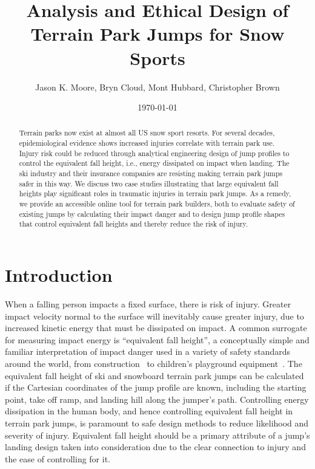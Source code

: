 \documentclass{article}
\title{Analysis and Ethical Design of Terrain Park Jumps for Snow Sports}
\author{Jason K. Moore, Bryn Cloud, Mont Hubbard, Christopher Brown}
\date{\today}
\begin{document}
\maketitle

\begin{abstract}
  Terrain parks now exist at almost all US snow sport resorts. For several
  decades, epidemiological evidence shows increased injuries correlate with
  terrain park use. Injury risk could be reduced through analytical engineering
  design of jump profiles to control the equivalent fall height, i.e., energy
  dissipated on impact when landing. The ski industry and their insurance
  companies are resisting making terrain park jumps safer in this way. We
  discuss two case studies illustrating that large equivalent fall heights play
  significant roles in traumatic injuries in terrain park jumps. As a remedy,
  we provide an accessible online tool for terrain park builders, both to
  evaluate safety of existing jumps by calculating their impact danger and to
  design jump profile shapes that control equivalent fall heights and thereby
  reduce the risk of injury.
\end{abstract}

\section{Introduction}
%
When a falling person impacts a fixed surface, there is risk of injury. Greater
impact velocity normal to the surface will inevitably cause greater injury, due
to increased kinetic energy that must be dissipated on impact. A common
surrogate for measuring impact energy is ``equivalent fall height'', a
conceptually simple and familiar interpretation of impact danger used in a
variety of safety standards around the world, from construction~\cite{OSHA2021}
to children's playground equipment~\cite{Chalmers1996}. The equivalent fall
height of ski and snowboard terrain park jumps can be
calculated~\cite{McNeil2012} if the Cartesian coordinates of the jump profile
are known, including the starting point, take off ramp, and landing hill along
the jumper's path. Controlling energy dissipation in the human body, and hence
controlling equivalent fall height in terrain park jumps, is paramount to safe
design methods to reduce likelihood and severity of injury. Equivalent fall
height should be a primary attribute of a jump's landing design taken into
consideration due to the clear connection to injury and the ease of
controlling for it.
\end{document}
